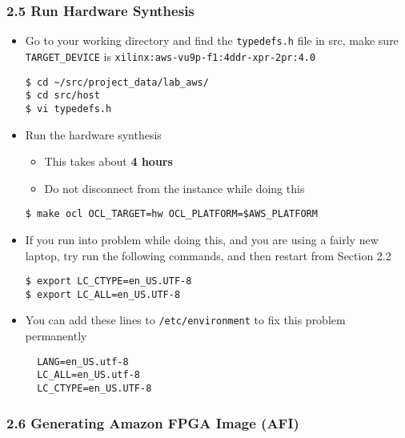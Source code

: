 \documentclass[]{article}
\begin{document}
\hypertarget{header-n319}{%
\subsubsection{2.5 Run Hardware Synthesis}\label{header-n319}}

\begin{itemize}
\item
  Go to your working directory and find the \texttt{typedefs.h} file in
  src, make sure \texttt{TARGET\_DEVICE} is
  \texttt{xilinx:aws-vu9p-f1:4ddr-xpr-2pr:4.0}

\begin{verbatim}
$ cd ~/src/project_data/lab_aws/
$ cd src/host
$ vi typedefs.h
\end{verbatim}
\end{itemize}

\begin{itemize}
\item
  Run the hardware synthesis

  \begin{itemize}
  \item
    This takes about \textbf{4 hours}
  \item
    Do not disconnect from the instance while doing this
  \end{itemize}

\begin{verbatim}
$ make ocl OCL_TARGET=hw OCL_PLATFORM=$AWS_PLATFORM
\end{verbatim}
\end{itemize}

\begin{itemize}
\item
  If you run into problem while doing this, and you are using a fairly
  new laptop, try run the following commands, and then restart from
  Section 2.2

\begin{verbatim}
$ export LC_CTYPE=en_US.UTF-8
$ export LC_ALL=en_US.UTF-8
\end{verbatim}
\item
  You can add these lines to \texttt{/etc/environment} to fix this
  problem permanently

\begin{verbatim}
  LANG=en_US.utf-8
  LC_ALL=en_US.utf-8
  LC_CTYPE=en_US.UTF-8
\end{verbatim}
\end{itemize}

\hypertarget{header-n354}{%
\subsubsection{2.6 Generating Amazon FPGA Image
(AFI)}\label{header-n354}}
\end{document}
